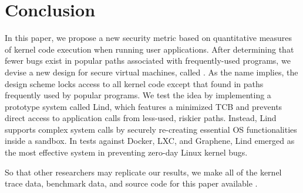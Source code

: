 \section{Conclusion}
\label{sec.conclusion}

In this paper, we propose a new security metric based on quantitative measures of kernel code execution when running user applications.
After determining that fewer bugs exist in popular paths associated with frequently-used
programs, we devise a new design for secure virtual machines, called \lip.
As the name implies, the design scheme locks access to all
kernel code except that found in paths frequently used by
popular programs. We test the \lip idea by implementing a prototype system
called Lind, which features a minimized TCB and prevents direct access to application
calls from less-used, riskier paths.
Instead, Lind supports complex system calls by securely re-creating
essential OS functionalities inside a sandbox.
In tests against Docker, LXC, and Graphene, Lind emerged as the most effective system in preventing
zero-day Linux kernel bugs.

So that other researchers may replicate our results, we make all of the kernel
trace data, benchmark data, and source code for this paper available \redact. 
